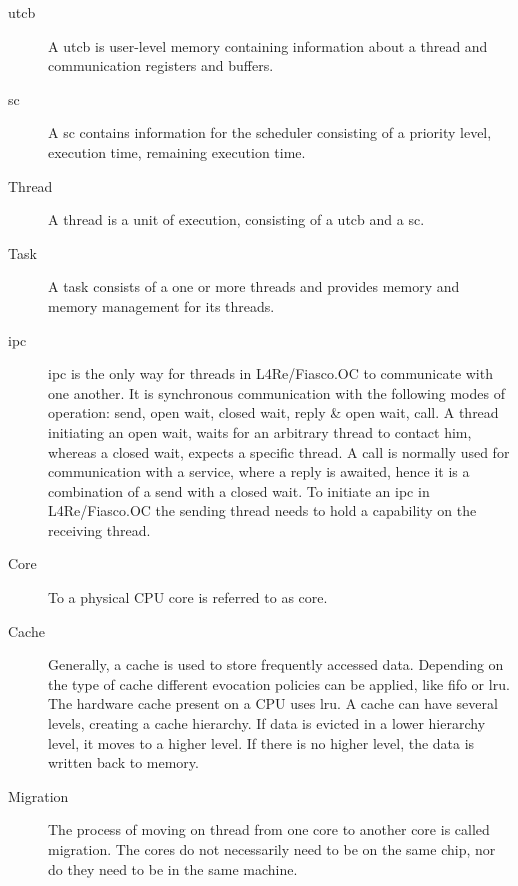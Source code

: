 \begin{description}
  \item[\Gls{utcb}] A \gls{utcb} is user-level memory containing information
    about a thread and communication registers and buffers.

  \item[\Gls{sc}] A \gls{sc} contains information for the scheduler consisting
    of a priority level, execution time, remaining execution time.

  \item[Thread] A thread is a unit of execution, consisting of a \gls{utcb}
    and a \gls{sc}.

  \item[Task] A task consists of a one or more threads and provides memory and
    memory management for its threads.

  \item[\Gls{ipc}] \Gls{ipc} is the only way for threads in L4Re/Fiasco.OC
    to communicate with one another.
    It is synchronous communication with the following modes of operation:
    send, open wait, closed wait, reply \& open wait, call.
    A thread initiating an open wait, waits for an arbitrary thread to contact
    him, whereas a closed wait, expects a specific thread.
    A call is normally used for communication with a service, where a reply is
    awaited, hence it is a
    combination of a send with a closed wait.
    To initiate an \gls{ipc} in L4Re/Fiasco.OC the sending thread needs to hold
    a capability on the receiving thread.


  \item[Core] To a physical CPU core is referred to as core.

  \item[Cache] Generally, a cache is used to store frequently accessed data.
    Depending on the type of cache different evocation policies can be applied,
    like \gls{fifo} or \gls{lru}.
    The hardware cache present on a CPU uses \gls{lru}.
    A cache can have several levels, creating a cache hierarchy.
    If data is evicted in a lower hierarchy level, it moves to a higher level.
    If there is no higher level, the data is written back to memory.

  \item[Migration] The process of moving on thread from one core
    to another core is called migration.
    The cores do not necessarily need to be on the same chip, nor do they need
    to be in the same machine.


\end{description}
